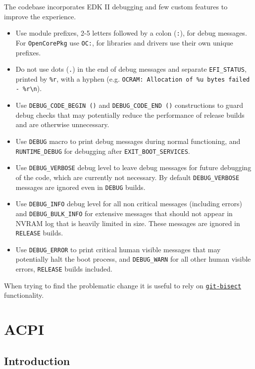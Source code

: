 \documentclass[]{article}
\providecommand{\tightlist}{%
  \setlength{\itemsep}{0pt}\setlength{\parskip}{0pt}}
\begin{document}
The codebase incorporates EDK II debugging and few custom features to improve the experience.
\begin{itemize}
\tightlist
\item Use module prefixes, 2-5 letters followed by a colon (\texttt{:}), for debug messages. For \texttt{OpenCorePkg}
use \texttt{OC:}, for libraries and drivers use their own unique prefixes.
\item Do not use dots (\texttt{.}) in the end of debug messages and separate \texttt{EFI\_STATUS}, printed by
\texttt{\%r}, with a hyphen (e.g. \texttt{OCRAM: Allocation of \%u bytes failed - \%r\textbackslash n}).
\item Use \texttt{DEBUG\_CODE\_BEGIN ()} and \texttt{DEBUG\_CODE\_END ()} constructions to guard debug checks
that may potentially reduce the performance of release builds and are otherwise unnecessary.
\item Use \texttt{DEBUG} macro to print debug messages during normal functioning, and \texttt{RUNTIME\_DEBUG} for
debugging after \texttt{EXIT\_BOOT\_SERVICES}.
\item Use \texttt{DEBUG\_VERBOSE} debug level to leave debug messages for future debugging of the code, which
are currently not necessary. By default \texttt{DEBUG\_VERBOSE} messages are ignored even in \texttt{DEBUG} builds.
\item Use \texttt{DEBUG\_INFO} debug level for all non critical messages (including errors) and \texttt{DEBUG\_BULK\_INFO}
for extensive messages that should not appear in NVRAM log that is heavily limited in size. These messages are ignored in
\texttt{RELEASE} builds.
\item Use \texttt{DEBUG\_ERROR} to print critical human visible messages that may potentially halt the boot process, and
\texttt{DEBUG\_WARN} for all other human visible errors, \texttt{RELEASE} builds included.
\end{itemize}

When trying to find the problematic change it is useful to rely on
\href{https://git-scm.com/docs/git-bisect}{\texttt{git-bisect}} functionality.

\section{ACPI}\label{acpi}

\subsection{Introduction}\label{acpiintro}
\end{document}
